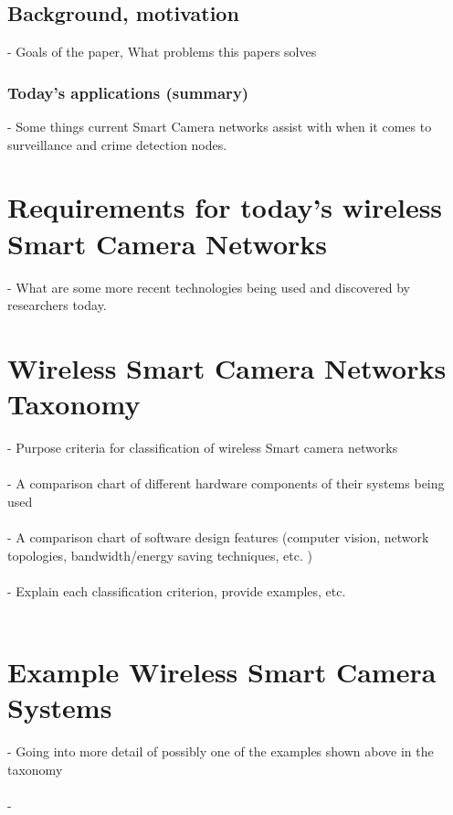 \documentclass[journal,transmag]{IEEEtran}
\begin{document}
\subsection{Background, motivation} 
\-- Goals of the paper, What problems this papers solves \\


\subsubsection{Today's applications (summary)}
\-- Some things current Smart Camera networks assist with when it comes to 
surveillance and crime detection nodes. \\


\section{Requirements for today's wireless Smart Camera Networks}
\-- What are some more recent technologies being used and discovered by
researchers today. \\

\section{Wireless Smart Camera Networks Taxonomy}
\-- Purpose criteria for classification of wireless Smart camera networks \\ \\
\-- A comparison chart of different hardware components of their systems 
	being used\\ \\
\-- A comparison chart of software design features (computer vision, network
	topologies, bandwidth/energy saving techniques, etc. )\\ \\
\-- Explain each classification criterion, provide examples, etc.\\ \\

\section{Example Wireless Smart Camera Systems}
\-- Going into more detail of possibly one of the examples shown above in
	the taxonomy\\ \\
\--
\end{document}
